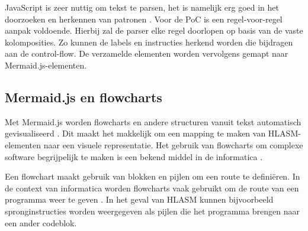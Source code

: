JavaScript is zeer nuttig om tekst te parsen, het is namelijk erg goed in het doorzoeken en herkennen van patronen \autocite{flanagan_2020}. Voor de PoC is een regel-voor-regel aanpak voldoende. Hierbij zal de parser elke regel doorlopen op basis van de vaste kolomposities. Zo kunnen de labels en instructies herkend worden die bijdragen aan de control-flow. De verzamelde elementen worden vervolgens gemapt naar Mermaid.js-elementen.

\subsection{Mermaid.js en flowcharts}

Met Mermaid.js worden flowcharts en andere structuren vanuit tekst automatisch gevisualiseerd \autocite{sveidqvist_jain_2021}. Dit maakt het makkelijk om een mapping te maken van HLASM-elementen naar een visuele representatie. Het gebruik van flowcharts om complexe software begrijpelijk te maken is een bekend middel in de informatica \autocite{ensmenger_2016}. 

Een flowchart maakt gebruik van blokken en pijlen om een route te definiëren. In de context van informatica worden flowcharts vaak gebruikt om de route van een programma weer te geven \autocite{charntaweekhun_Wangsiripitak_2006}. In het geval van HLASM kunnen bijvoorbeeld spronginstructies worden weergegeven als pijlen die het programma brengen naar een ander codeblok.



